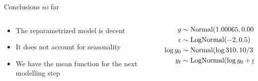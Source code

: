 \documentclass{beamer}
\begin{document}
\begin{frame}{Conclusions so far}
\begin{columns}
    \begin{column}{0.5\linewidth}
    \begin{itemize}
        \item The reparametrized model is decent
        \item It does not account for seasonality
        \item We have the mean function for the next modelling step
    \end{itemize}
    \end{column}
    \begin{column}{0.5\linewidth}
    \begin{align*}
        g &\sim \operatorname{Normal}(1.00065, 0.0005)\\
        {\epsilon} &\sim \operatorname{LogNormal}(-2, 0.5)\\
        \log y_0 &\sim \operatorname{Normal}(\log 310, 10/310)\\
        y_t & \sim \operatorname{LogNormal}(\log y_0 + g \cdot t, {\epsilon})
    \end{align*}
    \end{column}
\end{columns}
\end{frame}
\end{document}
